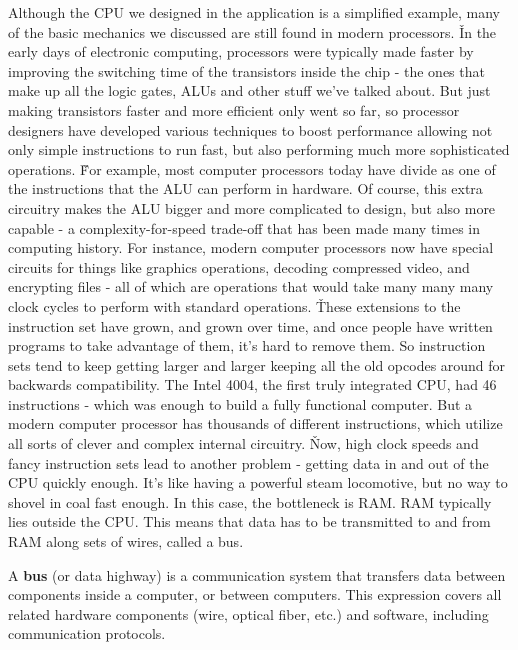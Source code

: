 Although the CPU we designed in the application is a simplified example, many of the basic mechanics we discussed are
still found in modern processors. \v

In the early days of electronic computing, processors were typically made faster by improving the switching time of
the transistors inside the chip - the ones that make up all the logic gates, ALUs and other stuff we've talked about.
But just making transistors faster and more efficient only went so far, so processor designers have developed
various techniques to boost performance allowing not only simple instructions to run fast, but also performing much
more sophisticated operations. \v

For example, most computer processors today have divide as one of the instructions that the ALU can perform in
hardware. Of course, this extra circuitry makes the ALU bigger and more complicated to design, but also more capable
- a complexity-for-speed trade-off that has been made many times in computing history. For instance, modern computer
processors now have special circuits for things like graphics operations, decoding compressed video, and encrypting
files - all of which are operations that would take many many many clock cycles to perform with standard operations. \v

These extensions to the instruction set have grown, and grown over time, and once people have written programs to
take advantage of them, it's hard to remove them. So instruction sets tend to keep getting larger and larger keeping
all the old opcodes around for backwards compatibility. The Intel 4004, the first truly integrated CPU, had 46
instructions - which was enough to build a fully functional computer. But a modern computer processor has thousands
of different instructions, which utilize all sorts of clever and complex internal circuitry. \v

Now, high clock speeds and fancy instruction sets lead to another problem - getting data in and out of the CPU
quickly enough. It's like having a powerful steam locomotive, but no way to shovel in coal fast enough. In this case,
the bottleneck is RAM. RAM typically lies outside the CPU. This means that data has to be transmitted to and from RAM
along sets of wires, called a bus.

\bd[Bus]
A \textbf{bus} (or data highway) is a communication system that transfers data between components inside a computer,
or between computers. This expression covers all related hardware components (wire, optical fiber, etc.) and
software, including communication protocols.
\ed

